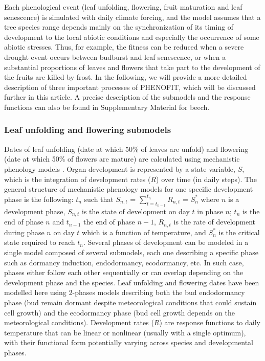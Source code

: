 \documentclass[preprint,12pt,authoryear]{elsarticle}
\begin{document}
Each phenological event (leaf unfolding, flowering, fruit maturation and leaf senescence) is simulated with daily climate forcing, and the model assumes that a tree species range depends mainly on the synchronization of its timing of development to the local abiotic conditions and especially the occurrence of some abiotic stresses. Thus, for example, the fitness can be reduced when a severe drought event occurs between budburst and leaf senescence, or when a substantial proportions of leaves and flowers that take part to the development of the fruits are killed by frost. In the following, we will provide a more detailed description of three important processes of PHENOFIT, which will be discussed further in this article. A precise description of the submodels and the response functions can also be found in Supplementary Material for beech.

\subsubsection{Leaf unfolding and flowering submodels}

Dates of leaf unfolding (date at which 50\% of leaves are unfold) and flowering (date at which 50\% of flowers are mature) are calculated using mechanistic phenology models \citep{Chuine2017}. Organ development is represented by a state variable, $S$, which is the integration of development rates ($R$) over time (in daily steps). The general structure of mechanistic phenology models for one specific development phase is the following:
$t_n$ such that $S_{n,t}$ = $\sum_{t=t_{n-1}}^{t_n} R_{n,t}$ = $S_n^*$ 
where $n$ is a development phase, $S_{n,t}$ is the state of development on day $t$ in phase $n$; $t_n$ is the end of phase $n$ and  $t_{n-1}$ the end of phase ${n-1}$, $R_{n,t}$ is the rate of development during phase $n$ on day $t$ which is a function of  temperature, and $S_n^*$ is the critical state required to reach $t_n$.  Several phases of development can be modeled in a single model composed of several submodels, each one describing a specific phase such as dormancy induction, endodormancy, ecodormancy, etc. In such case, phases either follow each other sequentially or can overlap depending on the development phase and the species. Leaf unfolding and flowering dates have been modelled here using 2-phases models describing both the bud endodormancy phase (bud remain dormant despite meteorological conditions that could sustain cell growth) and the ecodormancy phase (bud cell growth depends on the meteorological conditions).  Development rates ($R$) are response functions to daily temperature that can be linear or nonlinear (usually with a single optimum), \textcolor{customred}{with their functional form potentially varying across species and developmental phases. }
\end{document}
